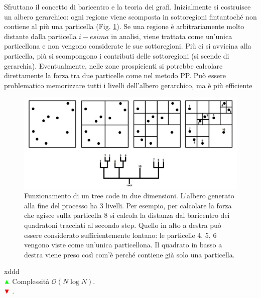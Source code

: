 \begin{example}
   Sfruttano il concetto di baricentro e la teoria dei grafi. Inizialmente si costruisce un albero gerarchico: ogni regione viene scomposta in sottoregioni fintantoché non contiene al più una particella (Fig. \ref{fig9:treecode}). Se una regione è arbitrariamente molto distante dalla particella $i-esima$ in analisi, viene trattata come un'unica particellona e non vengono considerate le sue sottoregioni. Più ci si avvicina alla particella, più si scompongono i contributi delle sottoregioni (si scende di gerarchia). Eventualmente, nelle zone prospicienti si potrebbe calcolare direttamente la forza tra due particelle come nel metodo PP. Può essere problematico memorizzare tutti i livelli dell'albero gerarchico, ma è più efficiente 
   \begin{figure}[H]
    \centering
    \includegraphics[width=.95 \textwidth]{Pictures/9/treecode.jpg}
    \caption{Funzionamento di un tree code in due dimensioni. L'albero generato alla fine del processo ha 3 livelli. Per esempio, per calcolare la forza che agisce sulla particella 8 si calcola la distanza dal baricentro dei quadratoni tracciati al secondo step. Quello in alto a destra può essere considerato sufficientemente lontano: le particelle 4, 5, 6 vengono viste come un'unica particellona. Il quadrato in basso a destra viene preso così com'è perché contiene già solo una particella. }\label{fig9:treecode}
\end{figure}
xddd
\\ ${\color{green} \blacktriangle  }$ Complessità $\mathcal{O} (N\log N)$. 
\\ ${\color{red} \blacktriangledown } $ .
\end{example}  